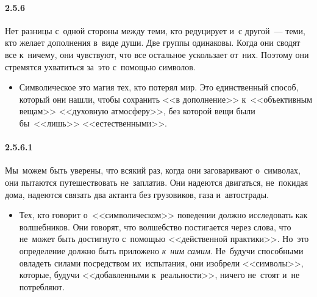 \paragraph{2.5.6}\hypertarget{par:2.5.6}{} Нет разницы с~одной стороны между теми, кто редуцирует и~с другой~--- теми, кто желает дополнения в~виде души. Две группы одинаковы. Когда они сводят все к~ничему, они чувствуют, что все остальное ускользает от~них. Поэтому они стремятся ухватиться за~это с~помощью символов. 
	\begin{itemize}
	\item 
	Символическое это магия тех, кто потерял мир. Это единственный способ, который они нашли, чтобы сохранить <<в дополнение>> к~<<объективным вещам>> <<духовную атмосферу>>, без которой вещи были бы~<<лишь>> <<естественными>>.
	\end{itemize}

\paragraph{2.5.6.1}\hypertarget{par:2.5.6.1}{} Мы~можем быть уверены, что всякий раз, когда они заговаривают о~символах, они пытаются путешествовать не~заплатив. Они надеются двигаться, не~покидая дома, надеются связать два актанта без грузовиков, газа и~автострады. 
	\begin{itemize}
	\item 
	Тех, кто говорит о~<<символическом>> поведении должно исследовать как волшебников. Они говорят, что волшебство постигается через слова, что не~может быть достигнуто с~помощью <<действенной практики>>. Но~это определение должно быть приложено {\itshape к~ним самим}. Не~будучи способными овладеть силами посредством их~испытания, они изобрели <<символы>>, которые, будучи <<добавленными к~реальности>>, ничего не~стоят и~не потребляют.
	\end{itemize}

